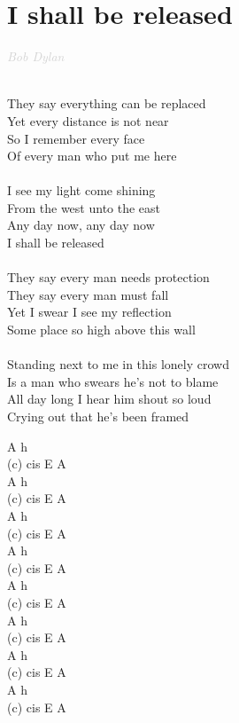 \documentclass[a5paper, 10pt]{book}
\begin{document}
\section{I shall be released}\textcolor{lightgray}{\textit{Bob Dylan}}\\~\\
\begin{minipage}[t]{0.8\textwidth}
They say everything can be replaced\\
Yet every distance is not near\\
So I remember every face\\
Of every man who put me here\\
\\
\hspace*{5mm}I see my light come shining \\
\hspace*{5mm}From the west unto the east\\
\hspace*{5mm}Any day now, any day now\\ 
\hspace*{5mm}I shall be released\\
\\
They say every man needs protection\\
They say every man must fall\\
Yet I swear I see my reflection\\
Some place so high above this wall\\
\\
Standing next to me in this lonely crowd\\
Is a man who swears he's not to blame\\
All day long I hear him shout so loud\\
Crying out that he's been framed\\
\end{minipage}
\begin{minipage}[t]{0.2\textwidth}
A h\\
(c) cis E A\\
A h\\
(c) cis E A\\

A h\\
(c) cis E A\\
A h\\
(c) cis E A\\

A h\\
(c) cis E A\\
A h\\
(c) cis E A\\

A h\\
(c) cis E A\\
A h\\
(c) cis E A\\

\end{minipage}
\end{document}
